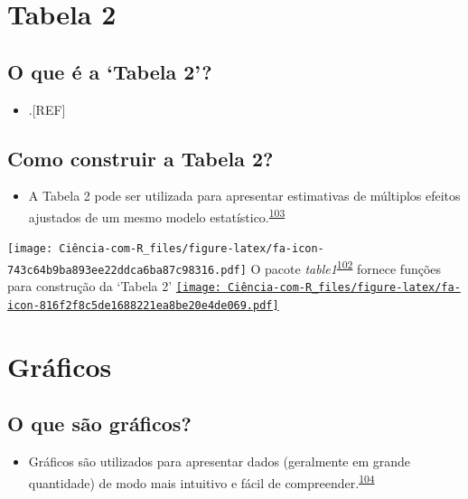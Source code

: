 \documentclass[
]{book}
\providecommand{\tightlist}{%
  \setlength{\itemsep}{0pt}\setlength{\parskip}{0pt}}
\begin{document}
\hypertarget{tabela-2}{%
\section{Tabela 2}\label{tabela-2}}

\hypertarget{o-que-uxe9-a-tabela-2}{%
\subsection{O que é a `Tabela 2'?}\label{o-que-uxe9-a-tabela-2}}

\begin{itemize}
\tightlist
\item
  .{[}REF{]}
\end{itemize}

\hypertarget{como-construir-a-tabela-2}{%
\subsection{Como construir a Tabela 2?}\label{como-construir-a-tabela-2}}

\begin{itemize}
\tightlist
\item
  A Tabela 2 pode ser utilizada para apresentar estimativas de múltiplos efeitos ajustados de um mesmo modelo estatístico.\textsuperscript{\protect\hyperlink{ref-Westreich2013}{103}}
\end{itemize}

\texttt{[image: Ciência-com-R\_files/figure-latex/fa-icon-743c64b9ba893ee22ddca6ba87c98316.pdf]} O pacote \emph{table1}\textsuperscript{\protect\hyperlink{ref-table1}{102}} fornece funções para construção da `Tabela 2' \href{https://cran.r-project.org/web/packages/table1/index.html}{\texttt{[image: Ciência-com-R\_files/figure-latex/fa-icon-816f2f8c5de1688221ea8be20e4de069.pdf]}}

\hypertarget{graficos}{%
\section{Gráficos}\label{graficos}}

\hypertarget{o-que-suxe3o-gruxe1ficos}{%
\subsection{O que são gráficos?}\label{o-que-suxe3o-gruxe1ficos}}

\begin{itemize}
\tightlist
\item
  Gráficos são utilizados para apresentar dados (geralmente em grande quantidade) de modo mais intuitivo e fácil de compreender.\textsuperscript{\protect\hyperlink{ref-Park2022}{104}}
\end{itemize}
\end{document}
